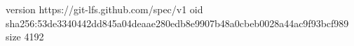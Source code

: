 version https://git-lfs.github.com/spec/v1
oid sha256:53de3340442dd845a04deaae280edb8e9907b48a0cbeb0028a44ac9f93bcf989
size 4192
